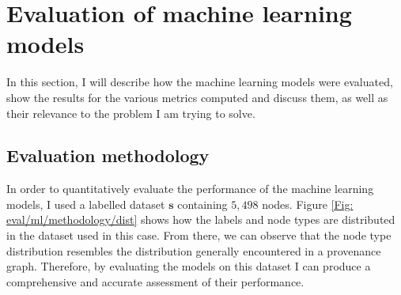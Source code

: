 	\section{Evaluation of machine learning models} \label{Section: eval/ml}
		In this section, I will describe how the machine learning models were evaluated, show the results for the various metrics computed and discuss them, as well as their relevance to the problem I am trying to solve.
		
	\subsection{Evaluation methodology} \label{Section: eval/ml/methodology}
		In order to quantitatively evaluate the performance of the machine learning models, I used a labelled dataset $\mathbf{s}$ containing $5,498$ nodes. Figure \ref{Fig: eval/ml/methodology/dist} shows how the labels and node types are distributed in the dataset used in this case. From there, we can observe that the node type distribution resembles the distribution generally encountered in a provenance graph. Therefore, by evaluating the models on this dataset I can produce a comprehensive and accurate assessment of their performance. 
